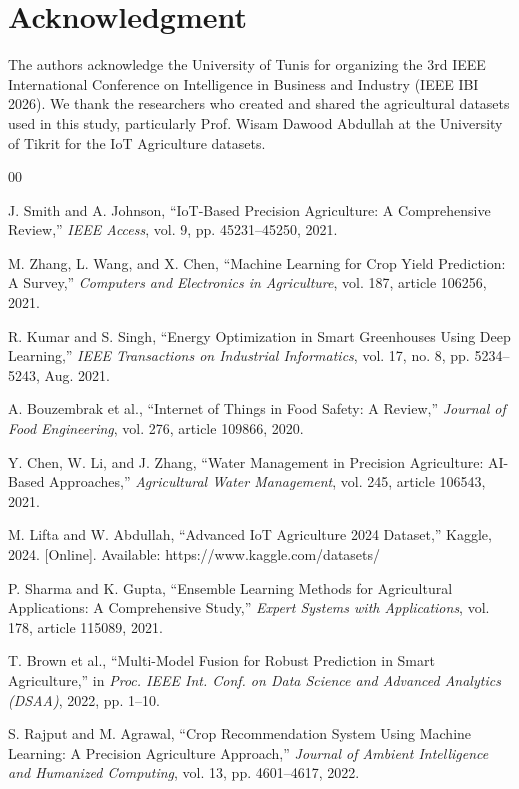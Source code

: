 \documentclass[conference]{IEEEtran}
\begin{document}
\section*{Acknowledgment}

The authors acknowledge the University of Tunis for organizing the 3rd IEEE International Conference on Intelligence in Business and Industry (IEEE IBI 2026). We thank the researchers who created and shared the agricultural datasets used in this study, particularly Prof. Wisam Dawood Abdullah at the University of Tikrit for the IoT Agriculture datasets.

\begin{thebibliography}{00}

 J. Smith and A. Johnson, ``IoT-Based Precision Agriculture: A Comprehensive Review,'' \textit{IEEE Access}, vol. 9, pp. 45231--45250, 2021.

 M. Zhang, L. Wang, and X. Chen, ``Machine Learning for Crop Yield Prediction: A Survey,'' \textit{Computers and Electronics in Agriculture}, vol. 187, article 106256, 2021.

 R. Kumar and S. Singh, ``Energy Optimization in Smart Greenhouses Using Deep Learning,'' \textit{IEEE Transactions on Industrial Informatics}, vol. 17, no. 8, pp. 5234--5243, Aug. 2021.

 A. Bouzembrak et al., ``Internet of Things in Food Safety: A Review,'' \textit{Journal of Food Engineering}, vol. 276, article 109866, 2020.

 Y. Chen, W. Li, and J. Zhang, ``Water Management in Precision Agriculture: AI-Based Approaches,'' \textit{Agricultural Water Management}, vol. 245, article 106543, 2021.

 M. Lifta and W. Abdullah, ``Advanced IoT Agriculture 2024 Dataset,'' Kaggle, 2024. [Online]. Available: https://www.kaggle.com/datasets/

 P. Sharma and K. Gupta, ``Ensemble Learning Methods for Agricultural Applications: A Comprehensive Study,'' \textit{Expert Systems with Applications}, vol. 178, article 115089, 2021.

 T. Brown et al., ``Multi-Model Fusion for Robust Prediction in Smart Agriculture,'' in \textit{Proc. IEEE Int. Conf. on Data Science and Advanced Analytics (DSAA)}, 2022, pp. 1--10.

 S. Rajput and M. Agrawal, ``Crop Recommendation System Using Machine Learning: A Precision Agriculture Approach,'' \textit{Journal of Ambient Intelligence and Humanized Computing}, vol. 13, pp. 4601--4617, 2022.


\end{thebibliography}
\end{document}
